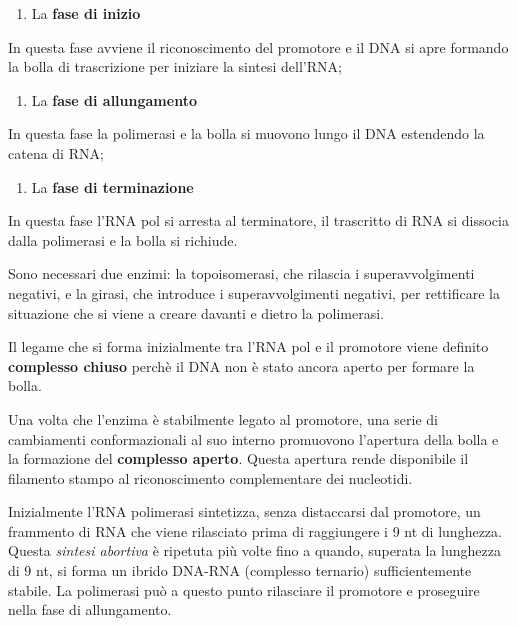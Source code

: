 \documentclass[]{article}
\begin{document}
\begin{enumerate}
\def\labelenumi{\arabic{enumi}.}
\itemsep1pt\parskip0pt
\item
  La \textbf{fase di inizio}
\end{enumerate}

In questa fase avviene il riconoscimento del promotore e il DNA si apre
formando la bolla di trascrizione per iniziare la sintesi dell'RNA;

\begin{enumerate}
\def\labelenumi{\arabic{enumi}.}
\setcounter{enumi}{1}
\itemsep1pt\parskip0pt
\item
  La \textbf{fase di allungamento}
\end{enumerate}

In questa fase la polimerasi e la bolla si muovono lungo il DNA
estendendo la catena di RNA;

\begin{enumerate}
\def\labelenumi{\arabic{enumi}.}
\setcounter{enumi}{2}
\itemsep1pt\parskip0pt
\item
  La \textbf{fase di terminazione}
\end{enumerate}

In questa fase l'RNA pol si arresta al terminatore, il trascritto di RNA
si dissocia dalla polimerasi e la bolla si richiude.

Sono necessari due enzimi: la topoisomerasi, che rilascia i
superavvolgimenti negativi, e la girasi, che introduce i
superavvolgimenti negativi, per rettificare la situazione che si viene a
creare davanti e dietro la polimerasi.

Il legame che si forma inizialmente tra l'RNA pol e il promotore viene
definito \textbf{complesso chiuso} perchè il DNA non è stato ancora
aperto per formare la bolla.

Una volta che l'enzima è stabilmente legato al promotore, una serie di
cambiamenti conformazionali al suo interno promuovono l'apertura della
bolla e la formazione del \textbf{complesso aperto}. Questa apertura
rende disponibile il filamento stampo al riconoscimento complementare
dei nucleotidi.

Inizialmente l'RNA polimerasi sintetizza, senza distaccarsi dal
promotore, un frammento di RNA che viene rilasciato prima di raggiungere
i 9 nt di lunghezza. Questa \emph{sintesi abortiva} è ripetuta più volte
fino a quando, superata la lunghezza di 9 nt, si forma un ibrido DNA-RNA
(complesso ternario) sufficientemente stabile. La polimerasi può a
questo punto rilasciare il promotore e proseguire nella fase di
allungamento.
\end{document}
